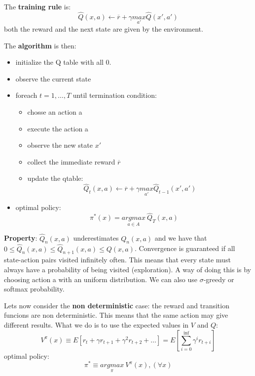 The \textbf{training rule} is:
\begin{equation}
    \hat{Q}(x, a) \xleftarrow{} \overline{r} + \gamma \underset{a'}{max}\hat{Q}(x', a')
\end{equation}
both the reward and the next state are given by the environment.

The \textbf{algorithm} is then:
\begin{itemize}
    \item initialize the Q table with all 0.
    \item observe the current state
    \item foreach $t = 1, \dots, T$ until termination condition:
    \begin{itemize}
        \item chosse an action a
        \item execute the action a
        \item observe the new state $x'$
        \item collect the immediate reward $\overline{r}$
        \item update the qtable:
        \begin{equation}
            \hat{Q}_{t}(x, a) \xleftarrow{} \overline{r} + \gamma \underset{a'}{max}\hat{Q}_{t-1}(x', a')
        \end{equation}
    \end{itemize}
    \item optimal policy: 
    \begin{equation}
        \pi^{*}(x) = \underset{a \in A}{argmax}\ \hat{Q}_{T}(x, a)
    \end{equation}
\end{itemize}

\textbf{Property}: $\hat{Q}_{n}(x, a)$ underestimates $Q_{n}(x, a)$ and we have that $0 \leq \hat{Q}_{n}(x, a) \leq \hat{Q}_{n + 1}(x, a) \leq Q(x, a)$. Convergence is guaranteed if all state-action pairs visited infinitely often. This means that every state must always have a probability of being visited (exploration). A way of doing this is by choosing action a with an uniform distribution. We can also use $\sigma$-greedy or softmax probability.


Lets now consider the \textbf{non deterministic} case: the reward and transition funcions are non deterministic. This means that the same action may give different results. What we do is to use the expected values in $V$ and $Q$:
\begin{equation}
    V^{\pi}(x) \equiv E[r_{t} + \gamma r_{t + 1} + \gamma^{2} r_{t+2} + \dots] = E[\sum_{i = 0} ^ {\inf}\gamma^{i} r_{t + i}]
\end{equation}
optimal policy:
\begin{equation}
    \pi^{*} \equiv \underset{\pi}{argmax}\ V^{\pi}(x),(\forall x)
\end{equation}

